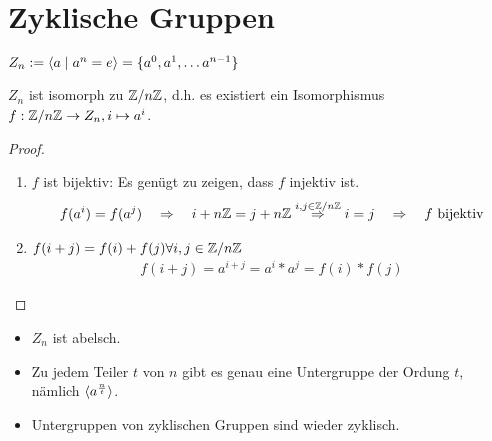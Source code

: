 \section{Zyklische Gruppen}

\begin{defin}
	$Z_n := \langle a \mid a^n = e \rangle = \{a^0,a^1, \dots a^{n-1}\}$
\end{defin}
\begin{lemma}
	$Z_n$ ist isomorph zu $\mathbb{Z} / n \mathbb{Z}$, d.h. es existiert ein Isomorphismus $f: \mathbb{Z} / n \mathbb{Z} \to Z_n, i \mapsto a^i$.
\end{lemma}
\begin{proof}
	\begin{enumerate}
		\item $f$ ist bijektiv: Es genügt zu zeigen, dass $f$ injektiv ist. \\
		\begin{align*}
		f(a^i) = f(a^j) \quad \Rightarrow \quad i + n\mathbb{Z} = j +n\mathbb{Z} \overset{i,j \in \mathbb{Z} / n \mathbb{Z}}{\quad \Rightarrow \quad} i=j \quad \Rightarrow \quad f \text{ bijektiv}
		\end{align*}
		\item $f(i+j) = f(i) + f(j) \forall i,j \in \mathbb{Z} / n \mathbb{Z}$ \\
		\begin{align*}
		f(i+j) = a^{i+j} = a^i * a^j = f(i) * f(j)
		\end{align*}
	\end{enumerate}
\end{proof}

\begin{bem}
	\begin{itemize}
		\item $Z_n$ ist abelsch.
		\item Zu jedem Teiler $t$ von $n$ gibt es genau eine Untergruppe der Ordung $t$, nämlich $\langle a^{\frac{n}{t}} \rangle$.
		\item Untergruppen von zyklischen Gruppen sind wieder zyklisch.
	\end{itemize}
\end{bem}

